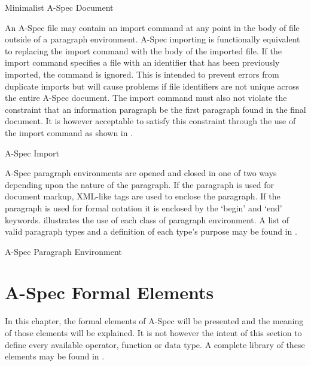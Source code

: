 \documentclass[letterpaper,10pt,draft]{book}
\begin{document}
\begin{example}
   

   \caption{Minimalist A-Spec Document}
   \label{ex:MinAS}
\end{example}

An A-Spec file may contain an import command at any point in the body of file outside
of a paragraph environment.  A-Spec importing is functionally equivalent to replacing
the import command with the body of the imported file.  If the import command specifies
a file with an identifier that has been previously imported, the command is ignored.
This is intended to prevent errors from duplicate imports but will cause problems
if file identifiers are not unique across the entire A-Spec document.  The import
command must also not violate the constraint that an information paragraph be the
first paragraph found in the final document.  It is however acceptable to satisfy
this constraint through the use of the import command as shown in .

\begin{example}
   

   \caption{A-Spec Import}
   \label{ex:ImportAS}
\end{example}

A-Spec paragraph environments are opened and closed in one of two ways depending
upon the nature of the paragraph.  If the paragraph is used for document markup,
XML-like tags are used to enclose the paragraph.  If the paragraph is used for formal
notation it is enclosed by the `begin' and `end' keywords.   illustrates
the use of each class of paragraph environment.  A list of valid paragraph types
and a definition of each type's purpose may be found in .

\begin{example}
   

   \caption{A-Spec Paragraph Environment}
   \label{ex:ParEnv}
\end{example}

\chapter{A-Spec Formal Elements}
   \label{ch:FormalElem}

In this chapter, the formal elements of A-Spec will be presented and the meaning
of those elements will be explained.  It is not however the intent of this section
to define every available operator, function or data type.  A complete library of
these elements may be found in .
\end{document}

